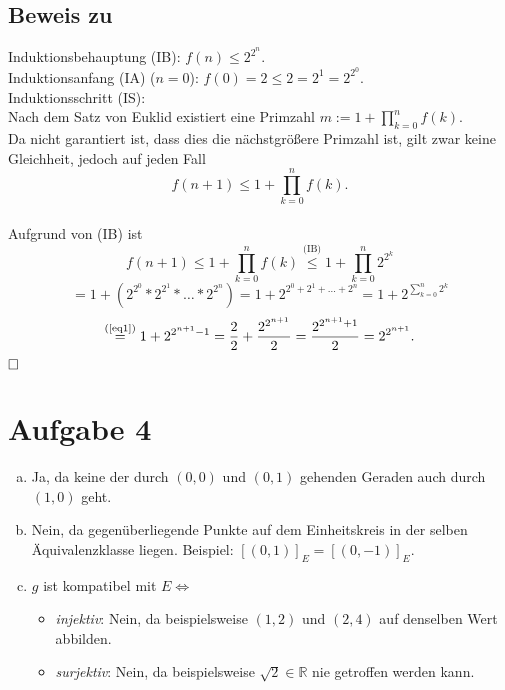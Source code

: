 \documentclass[12pt,a4paper]{article}
\newcommand{\qed}{\null\nobreak\hfill\square}
\begin{document}
\subsection*{Beweis zu }
Induktionsbehauptung (IB): $f(n) \leq 2^{2^n}$.\\
Induktionsanfang (IA) ($n = 0$): $f(0) = 2 \leq 2 = 2^1 = 2^{2^0}$.\\
Induktionsschritt (IS):\\
Nach dem Satz von Euklid existiert eine Primzahl $m := 1 + \prod\limits_{k = 0}^n f(k).$\\
Da nicht garantiert ist, dass dies die nächstgrößere Primzahl ist, gilt zwar keine Gleichheit, jedoch auf jeden Fall $$f(n + 1) \leq 1 + \prod\limits_{k = 0}^n f(k).$$\\
Aufgrund von (IB) ist
$$f(n + 1) \leq 1 + \prod\limits_{k = 0}^n f(k) \overset{\text{(IB)}}{\leq} 1 + \prod\limits_{k = 0}^n 2^{2^k}$$
$$= 1 + (2^{2^0} * 2^{2^1} * \dots * 2^{2^n}) = 1 + 2^{2^0 + 2^1 + \dots + 2^n} = 1 + 2^{\sum_{k=0}^{n} 2^k}$$
$$\overset{\text{(\ref{eq1})}}{=} 1 + 2^{2^{n + 1} - 1} = \frac{2}{2} + \frac{2^{2^{n + 1}}}{2} = \frac{2^{2^{n + 1} + 1}}{2} = 2^{2^{n + 1}}.$$
$\qed$


\section*{Aufgabe 4}

\begin{enumerate}[(a)]
    \item Ja, da keine der durch $(0, 0)$ und $(0, 1)$ gehenden Geraden auch durch $(1, 0)$ geht.
    \item Nein, da gegenüberliegende Punkte auf dem Einheitskreis in der selben Äquivalenzklasse liegen. Beispiel: $[(0, 1)]_E = [(0, -1)]_E$.
    \item $g$ ist kompatibel mit $E \Leftrightarrow$
    \begin{itemize}
         \item \textit{injektiv}: Nein, da beispielsweise $(1, 2)$ und $(2, 4)$ auf denselben Wert abbilden.
         \item \textit{surjektiv}: Nein, da beispielsweise $\sqrt{2} \in \mathbb{R}$ nie getroffen werden kann.
    \end{itemize}
\end{enumerate}

\end{document}
